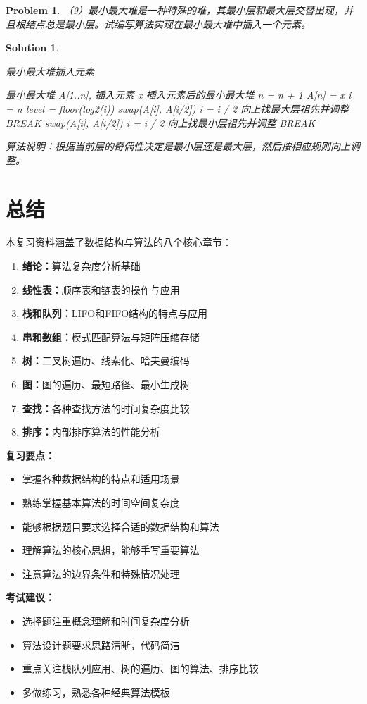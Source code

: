 \documentclass[12pt,a4paper]{amsart}
\newtheorem{problem}{Problem}[section]
\newtheorem{solution}{Solution}[section]
\begin{document}
\begin{problem}
（9）最小最大堆是一种特殊的堆，其最小层和最大层交替出现，并且根结点总是最小层。试编写算法实现在最小最大堆中插入一个元素。
\end{problem}

\begin{solution}
\begin{algorithm}
\caption{最小最大堆插入元素}
\begin{algorithmic}[1]
\REQUIRE 最小最大堆 A[1..n], 插入元素 x
\ENSURE 插入元素后的最小最大堆
\STATE n = n + 1
\STATE A[n] = x
\STATE i = n
\STATE level = floor(log2(i))
\STATE swap(A[i], A[i/2])
\STATE i = i / 2
\ELSE
\STATE 向上找最大层祖先并调整
\STATE BREAK
\ENDIF
\ELSE
{}
\STATE swap(A[i], A[i/2])
\STATE i = i / 2
\ELSE
\STATE 向上找最小层祖先并调整
\STATE BREAK
\ENDIF
\ENDIF
\ENDWHILE
\end{algorithmic}
\end{algorithm}

算法说明：根据当前层的奇偶性决定是最小层还是最大层，然后按相应规则向上调整。
\end{solution}

\section{总结}

本复习资料涵盖了数据结构与算法的八个核心章节：

\begin{enumerate}
\item \textbf{绪论：}算法复杂度分析基础
\item \textbf{线性表：}顺序表和链表的操作与应用
\item \textbf{栈和队列：}LIFO和FIFO结构的特点与应用
\item \textbf{串和数组：}模式匹配算法与矩阵压缩存储
\item \textbf{树：}二叉树遍历、线索化、哈夫曼编码
\item \textbf{图：}图的遍历、最短路径、最小生成树
\item \textbf{查找：}各种查找方法的时间复杂度比较
\item \textbf{排序：}内部排序算法的性能分析
\end{enumerate}

\textbf{复习要点：}
\begin{itemize}
\item 掌握各种数据结构的特点和适用场景
\item 熟练掌握基本算法的时间空间复杂度
\item 能够根据题目要求选择合适的数据结构和算法
\item 理解算法的核心思想，能够手写重要算法
\item 注意算法的边界条件和特殊情况处理
\end{itemize}

\textbf{考试建议：}
\begin{itemize}
\item 选择题注重概念理解和时间复杂度分析
\item 算法设计题要求思路清晰，代码简洁
\item 重点关注栈队列应用、树的遍历、图的算法、排序比较
\item 多做练习，熟悉各种经典算法模板
\end{itemize}
\end{document}
